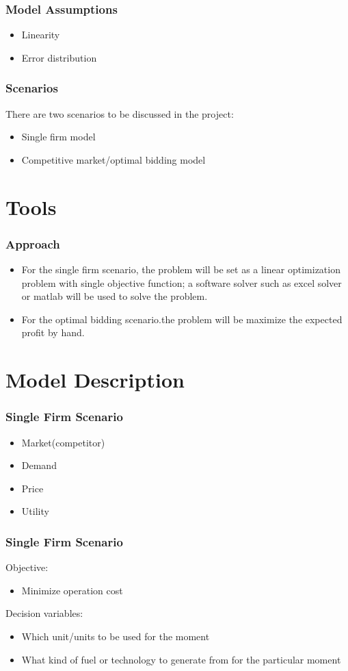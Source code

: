 \documentclass[compress,handout,10pt]{beamer}
\let\olditem\item
\renewcommand{\item}{\setlength{\itemsep}{0.5\baselineskip}\olditem}
\begin{document}
\begin{frame}
    \frametitle{Model Assumptions}
     \begin{itemize}
     \item Linearity
     \item Error distribution
     \end{itemize}
\end{frame}

\begin{frame}
    \frametitle{Scenarios}
There are two scenarios to be discussed in the project:
     \begin{itemize}
     \item Single firm model
     \item Competitive market/optimal bidding model
     \end{itemize}
\end{frame}

\section{Tools}
\begin{frame}
    \frametitle{Approach}
    \begin{itemize}
    \item For the single firm scenario, the problem will be set as a linear optimization problem with single objective function; a software solver such as excel solver or matlab will be used to solve the problem.
    \item For the optimal bidding scenario.the problem will be maximize the expected profit by hand.
    \end{itemize}
\end{frame}

\section{Model Description}

\begin{frame}
    \frametitle{Single Firm Scenario}
     \begin{itemize}
     \item Market(competitor)
     \item Demand
     \item Price
     \item Utility 
     \end{itemize}    
\end{frame}


\begin{frame}
    \frametitle{Single Firm Scenario}
     Objective:
     \begin{itemize}
     \item Minimize operation cost
     \end{itemize}
     Decision variables:
     \begin{itemize}
     \item Which unit/units to be used for the moment
     \item What kind of fuel or technology to generate from for the particular moment
     \end{itemize}    
\end{frame}
\end{document}
